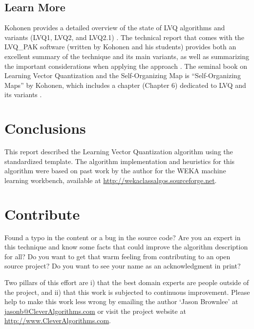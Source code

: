 \documentclass[a4paper, 11pt]{article}
\makeatletter
\newcommand{\myreportauthor}{Jason Brownlee}
\newcommand{\myreportemail}{jasonb@CleverAlgorithms.com}
\newcommand{\myreportwebsite}{http://www.CleverAlgorithms.com}
\makeatother
\begin{document}
% 
% 
\subsection{Learn More}
Kohonen provides a detailed overview of the state of LVQ algorithms and variants (LVQ1, LVQ2, and LVQ2.1) \cite{Kohonen1990}. The technical report that comes with the LVQ\_PAK software (written by Kohonen and his students) provides both an excellent summary of the technique and its main variants, as well as summarizing the important considerations when applying the approach \cite{Kohonen1996}.
The seminal book on Learning Vector Quantization and the Self-Organizing Map is ``Self-Organizing Maps'' by Kohonen, which includes a chapter (Chapter 6) dedicated to LVQ and its variants \cite{Kohonen1995}.

% 
% 
\section{Conclusions}
\label{sec:conclusions}
This report described the Learning Vector Quantization algorithm using the standardized template. The algorithm implementation and heuristics for this algorithm were based on past work by the author for the WEKA machine learning workbench, available at \url{http://wekaclassalgos.sourceforge.net}.

% 
% 
\section{Contribute}
\label{sec:contribute}
Found a typo in the content or a bug in the source code? 
Are you an expert in this technique and know some facts that could improve the algorithm description for all?
Do you want to get that warm feeling from contributing to an open source project? 
Do you want to see your name as an acknowledgment in print?

Two pillars of this effort are i) that the best domain experts are people outside of the project, and ii) that this work is subjected to continuous improvement. 
Please help to make this work less wrong by emailing the author `\myreportauthor' at \url{\myreportemail} or visit the project website at \url{\myreportwebsite}.



\end{document}
